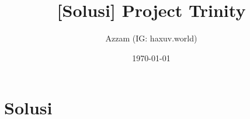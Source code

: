 

\title{[Solusi] Project Trinity}
\author{Azzam (IG: haxuv.world)}
\date{\today}



\maketitle

\renewcommand*\contentsname{Daftar Isi}
\tableofcontents

\newpage
\section{Solusi}


